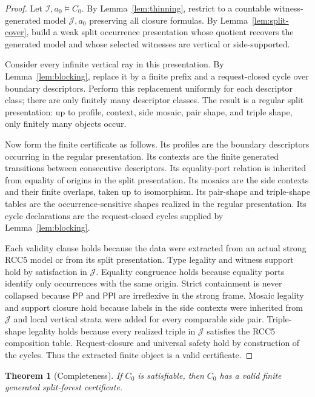 \documentclass[11pt]{article}
\newtheorem{theorem}{Theorem}[section]
\newcommand{\PP}{\mathsf{PP}}
\newcommand{\PPI}{\mathsf{PPI}}
\newcommand{\I}{\mathcal I}
\newcommand{\J}{\mathcal J}
\begin{document}
\begin{proof}
Let $\I,a_0\models C_0$.  By Lemma~\ref{lem:thinning}, restrict to a countable witness-generated model $\J,a_0$ preserving all closure formulas.  By Lemma~\ref{lem:split-cover}, build a weak split occurrence presentation whose quotient recovers the generated model and whose selected witnesses are vertical or side-supported.

Consider every infinite vertical ray in this presentation.  By Lemma~\ref{lem:blocking}, replace it by a finite prefix and a request-closed cycle over boundary descriptors.  Perform this replacement uniformly for each descriptor class; there are only finitely many descriptor classes.  The result is a regular split presentation: up to profile, context, side mosaic, pair shape, and triple shape, only finitely many objects occur.

Now form the finite certificate as follows.  Its profiles are the boundary descriptors occurring in the regular presentation.  Its contexts are the finite generated transitions between consecutive descriptors.  Its equality-port relation is inherited from equality of origins in the split presentation.  Its mosaics are the side contexts and their finite overlaps, taken up to isomorphism.  Its pair-shape and triple-shape tables are the occurrence-sensitive shapes realized in the regular presentation.  Its cycle declarations are the request-closed cycles supplied by Lemma~\ref{lem:blocking}.

Each validity clause holds because the data were extracted from an actual strong RCC5 model or from its split presentation.  Type legality and witness support hold by satisfaction in $\J$.  Equality congruence holds because equality ports identify only occurrences with the same origin.  Strict containment is never collapsed because $\PP$ and $\PPI$ are irreflexive in the strong frame.  Mosaic legality and support closure hold because labels in the side contexts were inherited from $\J$ and local vertical strata were added for every comparable side pair.  Triple-shape legality holds because every realized triple in $\J$ satisfies the RCC5 composition table.  Request-closure and universal safety hold by construction of the cycles.  Thus the extracted finite object is a valid certificate.
\end{proof}

\begin{theorem}[Completeness]\label{thm:completeness}
If $C_0$ is satisfiable, then $C_0$ has a valid finite generated split-forest certificate.
\end{theorem}
\end{document}
